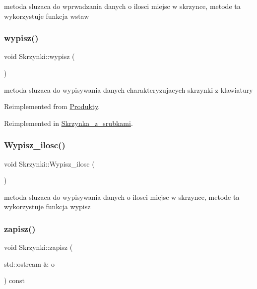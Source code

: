 metoda sluzaca do wprwadzania danych o ilosci miejsc w skrzynce, metode ta wykorzystuje funkcja wstaw \mbox{\label{class_skrzynki_adcf60a88ed78fba5a2dfdb54fa82b236}} 
\subsubsection{\texorpdfstring{wypisz()}{wypisz()}}
{\footnotesize\ttfamily void Skrzynki\+::wypisz (\begin{DoxyParamCaption}{ }\end{DoxyParamCaption})\hspace{0.3cm}{\ttfamily [virtual]}}

metoda sluzaca do wypisywania danych charakteryzujacych skrzynki z klawiatury 

Reimplemented from \mbox{\hyperlink{class_produkty_a720c6591cfbb332f99baccf0f54c4ada}{Produkty}}.



Reimplemented in \mbox{\hyperlink{class_skrzynka__z__srubkami_ac543a438ce88bc79a9e8a398b6beff7c}{Skrzynka\+\_\+z\+\_\+srubkami}}.

\mbox{\label{class_skrzynki_aeb630b847e07d0b66a1ba76ff8bec293}} 
\subsubsection{\texorpdfstring{Wypisz\+\_\+ilosc()}{Wypisz\_ilosc()}}
{\footnotesize\ttfamily void Skrzynki\+::\+Wypisz\+\_\+ilosc (\begin{DoxyParamCaption}{ }\end{DoxyParamCaption})}

metoda sluzaca do wypisywania danych o ilosci miejsc w skrzynce, metode ta wykorzystuje funkcja wypisz \mbox{\label{class_skrzynki_a2980647e51a17161872064efc5f1b185}} 
\subsubsection{\texorpdfstring{zapisz()}{zapisz()}}
{\footnotesize\ttfamily void Skrzynki\+::zapisz (\begin{DoxyParamCaption}\item[{std\+::ostream \&}]{o }\end{DoxyParamCaption}) const\hspace{0.3cm}{\ttfamily [virtual]}}

